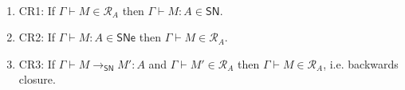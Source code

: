 \documentclass{article}
\newcommand{\SN}{\mathsf{SN}}
\newcommand{\SNe}{\mathsf{SNe}}
\newcommand{\CR}{\textsf{CR}}
\newcommand{\denot}[1]{\mathcal{R}_{#1}}
\newcommand{\inden}[3]{#1 \vdash #2 \in \denot{#3}}
\newcommand{\redSN}{\longrightarrow_\SN}
\def\lv{\mathopen{{[\kern-0.14em[}}}    %
\def\rv{\mathclose{{]\kern-0.14em]}}}   %
\newcommand{\den}[1]{\lv #1 \rv}
\begin{document}



\begin{theorem}\label{thm:redcand}~
  \begin{enumerate}
  \item\label{cr1} \CR 1: If $\inden{\Gamma}{M}{A}$ then $\Gamma \vdash M : A \in \SN$. %
  \item\label{cr2} \CR 2: If $\Gamma \vdash M : A \in \SNe$ then $\inden{\Gamma}{M}{A}$. %
  \item\label{cr3} \CR 3: If $\Gamma \vdash M \redSN M' : A$ and $\inden{\Gamma}{M'}{A}$ then $\inden{\Gamma}{M}{A}$, i.e. backwards closure.
  \end{enumerate}
\end{theorem}
\end{document}

